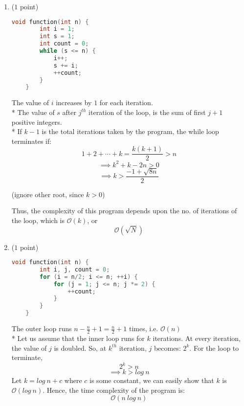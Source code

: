 \documentclass[14pt]{article}
\begin{document}
\begin{enumerate}[label=\alph*)]
    \item ($1$ point)
    
    \begin{lstlisting}[language=C++, title={Part (a)}]
    void function(int n) {
        int i = 1;
        int s = 1;
        int count = 0;
        while (s <= n) {
            i++;
            s += i;
            ++count;
        }
    }
    \end{lstlisting}
    
    \begin{myframe}[width=500pt,height=250pt,top=10pt,bottom=10pt,left=10pt,right=10pt,arc=10pt,auto outer arc]
    The value of $i$ increases by $1$ for each iteration. \\*
    The value of $s$ after $j^{th}$ iteration of the loop, is the sum of first $j+1$ positive integers. \\*
    If $k-1$ is the total iterations taken by the program, the while loop terminates if:
    \[1 + 2 + \cdots + k = \frac{k(k + 1)}{2} > n\]
    \[\implies k^2 + k - 2n > 0 \]
    \[\implies k > \frac{-1 + \sqrt{8n}}{2} \] 
    \begin{flushright}
    (ignore other root, since $k > 0$)
    \end{flushright}
    Thus, the complexity of this program depends upon the no. of iterations of the loop, which is $\mathcal{O}(k)$, or 
    \[ \boxed{\mathcal{O}(\sqrt{N})} \]
    
    \end{myframe}
    \item ($1$ point)
    \begin{lstlisting}[language=C++, title={Part (b)}]
    void function(int n) {
        int i, j, count = 0;
        for (i = n/2; i <= n; ++i) {
            for (j = 1; j <= n; j *= 2) {
                ++count;
            }
        }
    }
    \end{lstlisting}
    \begin{myframe}[width=500pt,height=280pt,top=10pt,bottom=10pt,left=10pt,right=10pt,arc=10pt,auto outer arc]
    The outer loop runs $n - \frac{n}{2} + 1 = \frac{n}{2} + 1$ times, i.e. $\mathcal{O}(n)$ \\*
    Let us assume that the inner loop runs for $k$ iterations.
    At every iteration, the value of $j$ is doubled. So, at $k^{th}$ iteration, $j$ becomes: $2^{k}$. For the loop to terminate,
    \[ 2^{k} > n\]
    \[ \implies k > log\ n\]
    Let $k = log\ n + c$ where $c$ is some constant, we can easily show that $k$ is $\mathcal{O}(log\ n)$.
    Hence, the time complexity of the program is:
    \[ \boxed{\mathcal{O}(n\ log\ n)} \]
    \end{myframe}
    

\end{enumerate}
\end{document}
